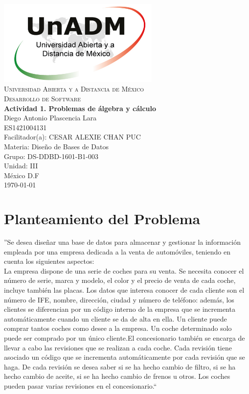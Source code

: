 \documentclass[spanish,12pt,letterpapper]{article}
\begin{document}
	\begin{titlepage}
		\begin{center}
			\includegraphics[width=0.6\textwidth]{../logoUnADM}~\\[1cm] 
			\textsc{Universidad Abierta y a Distancia de México}\\[0.8cm]
			\textsc{Desarrollo de Software}\\[1.8cm]
			
			\textbf{ \Large Actividad 1. Problemas de álgebra y cálculo  }\\[3cm]
			
			Diego Antonio Plascencia Lara\\ ES1421004131 \\[0.4cm]
			Facilitador(a): CESAR ALEXIE CHAN PUC  \\
			Materia: Diseño de Bases de Datos\\
			Grupo: DS-DDBD-1601-B1-003 \\
			Unidad: III \\
			
			\vfill México D.F\\{\today}
			
		\end{center}
	\end{titlepage}
	
	\section{Planteamiento del Problema}	
	''Se desea diseñar una base de datos para almacenar y gestionar la información empleada por una empresa dedicada a la venta de automóviles, teniendo en cuenta los siguientes aspectos:\\
	
	La empresa dispone de una serie de coches para su venta. Se necesita conocer el número de serie, marca y modelo, el color y el precio de venta de cada coche, incluye también las placas. Los datos que interesa conocer de cada cliente son el número de IFE, nombre, dirección, ciudad y número de teléfono: además, los clientes se diferencian por un código interno de la empresa que se incrementa automáticamente cuando un cliente se da de alta en ella. Un cliente puede comprar tantos coches como desee a la empresa. Un coche determinado solo puede ser comprado por un único cliente.El concesionario también se encarga de llevar a cabo las revisiones que se realizan a cada coche. Cada revisión tiene asociado un código que se incrementa automáticamente por cada revisión que se haga. De cada revisión se desea saber si se ha hecho cambio de filtro, si se ha hecho cambio de aceite, si se ha hecho cambio de frenos u otros. Los coches pueden pasar varias revisiones en el concesionario.``\\
	
\end{document}
